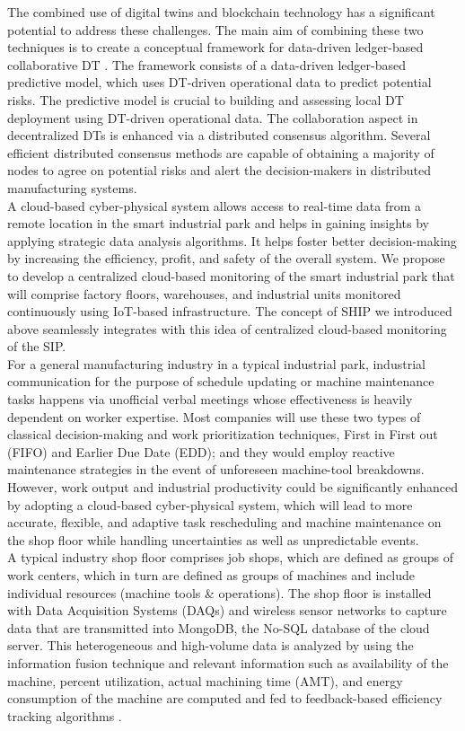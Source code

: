 \documentclass[paper=a4wide, fontsize=12pt]{scrartcl}
\begin{document}
The combined use of digital twins and blockchain technology has a significant potential to address these challenges. The main aim of combining these two techniques is to create a conceptual framework for data-driven ledger-based collaborative DT \cite{machines9090193}. The framework consists of a data-driven ledger-based predictive model, which uses DT-driven operational data to predict potential risks. The predictive model is crucial to building and assessing local DT deployment using DT-driven operational data. The collaboration aspect in decentralized DTs is enhanced via a distributed consensus algorithm. Several efficient distributed consensus methods are capable of obtaining a majority of nodes to agree on potential risks and alert the decision-makers in distributed manufacturing systems. \\

A cloud-based cyber-physical system allows access to real-time data from a remote location in the smart industrial park and helps in gaining insights by applying strategic data analysis algorithms. It helps foster better decision-making by increasing the efficiency, profit, and safety of the overall system. We propose to develop a centralized cloud-based monitoring of the smart industrial park that will comprise factory floors, warehouses, and industrial units monitored continuously using IoT-based infrastructure. The concept of SHIP we introduced above seamlessly integrates with this idea of centralized cloud-based monitoring of the SIP. \\

For a general manufacturing industry in a typical industrial park, industrial communication for the purpose of schedule updating or machine maintenance tasks happens via unofficial verbal meetings whose effectiveness is heavily dependent on worker expertise. Most companies will use these two types of classical decision-making and work prioritization techniques, First in First out (FIFO) and Earlier Due Date (EDD); and they would employ reactive maintenance strategies in the event of unforeseen machine-tool breakdowns. However, work output and industrial productivity could be significantly enhanced by adopting a cloud-based cyber-physical system, which will lead to more accurate, flexible, and adaptive task rescheduling and machine maintenance on the shop floor while handling uncertainties as well as unpredictable events. \\

A typical industry shop floor comprises job shops, which are defined as groups of work centers, which in turn are defined as groups of machines and include individual resources (machine tools \& operations). The shop floor is installed with Data Acquisition Systems (DAQs) and wireless sensor networks to capture data that are transmitted into MongoDB, the No-SQL database of the cloud server. This heterogeneous and high-volume data is analyzed by using the information fusion technique and relevant information such as availability of the machine, percent utilization, actual machining time (AMT), and energy consumption of the machine are computed and fed to feedback-based efficiency tracking algorithms \cite{QIU201316}.
\end{document}
